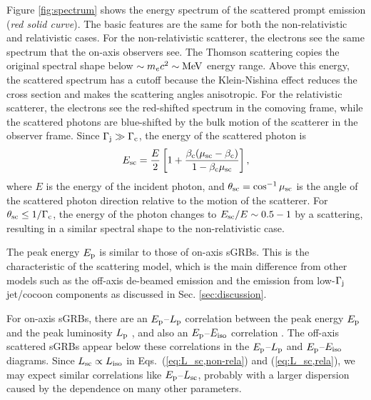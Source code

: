 \documentclass{emulateapj}
\begin{document}
Figure \ref{fig:spectrum} shows the energy spectrum 
of the scattered prompt emission ({\it red solid curve}).
The basic features are the same for both the non-relativistic and relativistic cases.
For the non-relativistic scatterer,
the electrons see the same spectrum that the on-axis observers see.
The Thomson scattering copies the original spectral shape 
below $\sim m_e c^2 \sim {\rm MeV}$ energy range.
Above this energy, the scattered spectrum has a cutoff
because the Klein-Nishina effect reduces the cross section
and makes the scattering angles anisotropic.
For the relativistic scatterer, 
the electrons see the red-shifted spectrum in the comoving frame, 
while the scattered photons are blue-shifted by the bulk motion of the scatterer in the observer frame. 
Since $\Gamma_{\rm j}\gg\Gamma_{\rm c}$, the energy of the scattered photon is 
\begin{eqnarray}
E_{\rm sc}=\frac{E}{2}\left[1+\frac{\beta_{\rm c}(\mu_{\rm sc}-\beta_{\rm c})}{1-\beta_{\rm c}\mu_{\rm sc}}\right],
\end{eqnarray}
where $E$ is the energy of the incident photon, 
and $\theta_{\rm sc}=\cos^{-1}\mu_{\rm sc}$ is the angle of the scattered photon direction
relative to the motion of the scatterer. 
For $\theta_{\rm sc}\le1/\Gamma_{\rm c}$, 
the energy of the photon changes to $E_{\rm sc}/E\sim0.5-1$ by a scattering, 
resulting in a similar spectral shape to the non-relativistic case. 

The peak energy $E_{\rm p}$ is similar to those of on-axis sGRBs.
This is the characteristic of the scattering model,
which is the main difference from 
other models such as the off-axis de-beamed emission and 
the emission from low-$\Gamma_{\rm j}$ jet/cocoon components 
as discussed in Sec. \ref{sec:discussion}.

For on-axis sGRBs, there are an $E_{\rm p}$--$L_{\rm p}$ correlation
between the peak energy $E_{\rm p}$ and the peak luminosity $L_{\rm p}$ \citep{2004ApJ...609..935Y, 2013MNRAS.431.1398T},
and also an $E_{\rm p}$--$E_{\rm iso}$ correlation \citep{2002A&A...390...81A, 2013MNRAS.431.1398T}.
The off-axis scattered sGRBs appear below these correlations 
in the $E_{\rm p}$--$L_{\rm p}$ and $E_{\rm p}$--$E_{\rm iso}$ diagrams.
Since $L_{\rm sc} \propto L_{\rm iso}$ in Eqs.~(\ref{eq:L_sc,non-rela}) and (\ref{eq:L_sc,rela}), 
we may expect similar correlations like
$E_{\rm p}$--$L_{\rm sc}$, probably
with a larger dispersion caused by the dependence on many other parameters.
\end{document}
